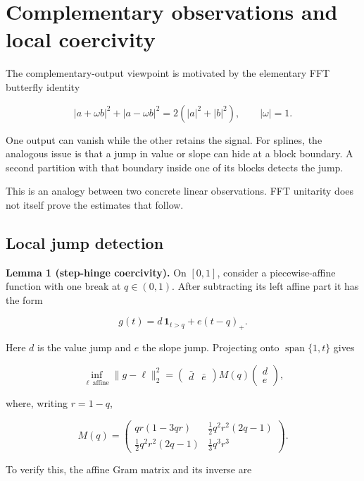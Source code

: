 \documentclass[
  11pt,
]{article}
\begin{document}
\hypertarget{complementary-observations-and-local-coercivity}{%
\section{Complementary observations and local
coercivity}\label{complementary-observations-and-local-coercivity}}

The complementary-output viewpoint is motivated by the elementary FFT
butterfly identity

\[
|a+\omega b|^2+|a-\omega b|^2
=2(|a|^2+|b|^2),\qquad |\omega|=1.
\]

One output can vanish while the other retains the signal. For splines,
the analogous issue is that a jump in value or slope can hide at a block
boundary. A second partition with that boundary inside one of its blocks
detects the jump.

This is an analogy between two concrete linear observations. FFT
unitarity does not itself prove the estimates that follow.

\hypertarget{local-jump-detection}{%
\subsection{Local jump detection}\label{local-jump-detection}}

\textbf{Lemma 1 (step-hinge coercivity).} On \([0,1]\), consider a
piecewise-affine function with one break at \(q\in(0,1)\). After
subtracting its left affine part it has the form

\[
g(t)=d\,\mathbf1_{t>q}+e(t-q)_+.
\]

Here \(d\) is the value jump and \(e\) the slope jump. Projecting onto
\(\operatorname{span}\{1,t\}\) gives

\[
\inf_{\ell\ \mathrm{affine}}\|g-\ell\|_2^2
=\begin{pmatrix}\bar d&\bar e\end{pmatrix}
M(q)\begin{pmatrix}d\\e\end{pmatrix}, \tag{5}
\]

where, writing \(r=1-q\),

\[
M(q)=
\begin{pmatrix}
qr(1-3qr)&\frac12q^2r^2(2q-1)\\
\frac12q^2r^2(2q-1)&\frac13q^3r^3
\end{pmatrix}.
\]

To verify this, the affine Gram matrix and its inverse are
\end{document}
